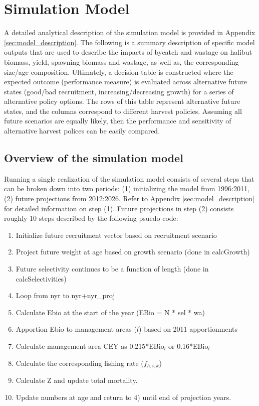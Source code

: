 
\section{Simulation Model} %
\label{sec:simulation_model}
A detailed analytical description of the simulation model is provided in Appendix \ref{sec:model_description}.  The following is a summary description of specific model outputs that are used to describe the impacts of bycatch and wastage on halibut biomass, yield, spawning biomass and wastage, as well as, the corresponding size/age composition.  Ultimately, a decision table is constructed where the expected outcome (performance measure) is evaluated across alternative future states (good/bad recruitment, increasing/decreasing growth) for a series of alternative policy options.  The rows of this table represent alternative future states, and the columns correspond to different harvest policies. Assuming all future scenarios are equally likely, then the performance and sensitivity of alternative harvest polices can be easily compared.

\subsection{Overview of the simulation model} %
\label{sub:overview_of_the_simulation_model}
 Running a single realization of the simulation model consists of several steps that can be broken down into two periods: (1) initializing the model from 1996:2011, (2) future projections from 2012:2026.  Refer to Appendix \ref{sec:model_description} for detailed information on step (1).  Future projections in step (2) consists roughly 10 steps described by the following psuedo code:
\begin{enumerate}
	\item	Initialize future recruitment vector based on recruitment scenario
	\item	Project future weight at age based on growth scenario  (done in calcGrowth)
	\item	Future selectivity continues to be a function of length (done in calcSelectivities)
	\item	Loop from nyr to nyr+nyr\_proj
	\item	Calculate Ebio at the start of the year (EBio = N * sel * wa)
	\item	Apportion Ebio to management areas ($l$) based on 2011 apportionments
	\item	Calculate management area CEY as 0.215*EBio$_l$ or 0.16*EBio$_l$
	\item	Calculate the corresponding fishing rate ($f_{h,i,k}$)
	\item	Calculate Z and update total mortality.
	\item	Update numbers at age and return to 4) until end of projection years.
\end{enumerate}

